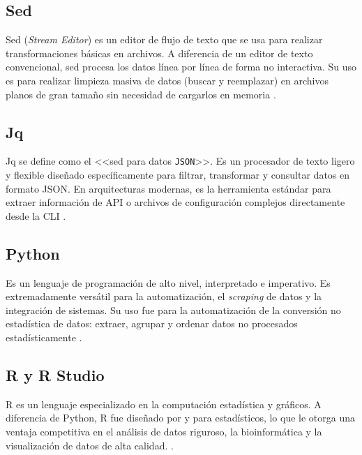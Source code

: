 \documentclass[12pt, letter paper]{report}
\begin{document}
      \subsection{Sed} %
      \label{sub:sed}
        Sed (\textit{Stream Editor}) es un editor de flujo de texto que se usa
        para realizar transformaciones básicas en archivos. A diferencia de un
        editor de texto convencional, sed procesa los datos línea por línea de
        forma no interactiva. Su uso es para realizar limpieza masiva de datos
        (buscar y reemplazar) en archivos planos de gran tamaño sin necesidad
        de cargarlos en memoria \cite{sed_manual}.

      \subsection{Jq} %
      \label{sub:jq}
        Jq se define como el <<sed para datos \texttt{JSON}>>. Es un procesador
        de texto ligero y flexible diseñado específicamente para filtrar,
        transformar y consultar datos en formato JSON. En arquitecturas
        modernas, es la herramienta estándar para extraer información de API o
        archivos de configuración complejos directamente desde la CLI
        \cite{jq_manual}.

      \subsection{Python} %
      \label{sub:python}
        Es un lenguaje de programación de alto nivel, interpretado e imperativo.
        Es extremadamente versátil para la automatización, el \textit{scraping}
        de datos y la integración de sistemas. Su uso fue para la automatización
        de la conversión no estadística de datos: extraer, agrupar y ordenar
        datos no procesados estadísticamente \cite{python_3}.

      \subsection{R y R Studio} %
      \label{sub:r_y_r_studio}
        R es un lenguaje especializado en la computación estadística y gráficos.
        A diferencia de Python, R fue diseñado por y para estadísticos, lo que
        le otorga una ventaja competitiva en el análisis de datos riguroso, la
        bioinformática y la visualización de datos de alta calidad.
        \cite{r_language}.
\end{document}
